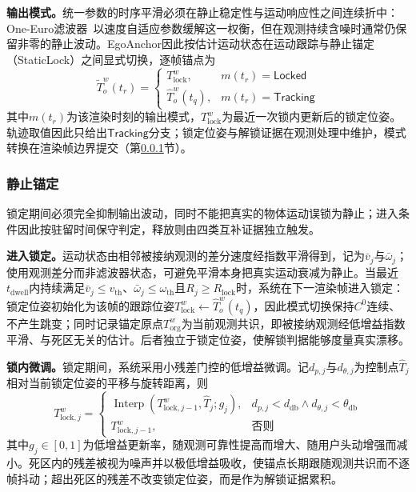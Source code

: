\documentclass[review]{vgtc}
\begin{document}
\textbf{输出模式。}统一参数的时序平滑必须在静止稳定性与运动响应性之间连续折中：One-Euro滤波器~\cite{casiez2012oneeuro}以速度自适应参数缓解这一权衡，但在观测持续含噪时通常仍保留非零的静止波动。EgoAnchor因此按估计运动状态在运动跟踪与静止锚定（StaticLock）之间显式切换，逐帧锚点为
\begin{equation}
\widetilde{T}_o^w(t_r) = \begin{cases}
T_{\mathrm{lock}}^w, & m(t_r) = \mathsf{Locked} \\
\widehat{T}_o^w(t_q), & m(t_r) = \mathsf{Tracking}
\end{cases}
\label{eq:staticlock}
\end{equation}
其中$m(t_r)$为该渲染时刻的输出模式，$T_{\mathrm{lock}}^w$为最近一次锁内更新后的锁定位姿。轨迹取值因此只给出$\mathsf{Tracking}$分支；锁定位姿与解锁证据在观测处理中维护，模式转换在渲染帧边界提交（第\ref{sec:staticlock}节）。

\subsubsection{静止锚定}\label{sec:staticlock}

锁定期间必须完全抑制输出波动，同时不能把真实的物体运动误锁为静止；进入条件因此按驻留时间保守判定，释放则由四类互补证据独立触发。

\textbf{进入锁定。}运动状态由相邻被接纳观测的差分速度经指数平滑得到，记为$\bar{v}_j$与$\bar{\omega}_j$；使用观测差分而非滤波器状态，可避免平滑本身把真实运动衰减为静止。当最近$t_{\mathrm{dwell}}$内持续满足$\bar{v}_j \leq v_{\mathrm{th}}$、$\bar{\omega}_j \leq \omega_{\mathrm{th}}$且$R_j \geq R_{\mathrm{lock}}$时，系统在下一渲染帧进入锁定：锁定位姿初始化为该帧的跟踪位姿$T_{\mathrm{lock}}^w \leftarrow \widehat{T}_o^w(t_q)$，因此模式切换保持$C^0$连续、不产生跳变；同时记录锚定原点$T_{\mathrm{org}}^w$为当前观测共识，即被接纳观测经低增益指数平滑、与死区无关的估计。后者独立于锁定位姿，使解锁判据能够度量真实漂移。

\textbf{锁内微调。}锁定期间，系统采用小残差门控的低增益微调。记$d_{p,j}$与$d_{\theta,j}$为控制点$\widehat{T}_j$相对当前锁定位姿的平移与旋转距离，则
\begin{equation}
T_{\mathrm{lock},j}^w = \begin{cases}
\operatorname{Interp}\!\left(T_{\mathrm{lock},j-1}^w, \widehat{T}_j; g_j\right), & d_{p,j} < d_{\mathrm{db}} \wedge d_{\theta,j} < \theta_{\mathrm{db}} \\
T_{\mathrm{lock},j-1}^w, & \text{否则}
\end{cases}
\label{eq:lock-creep}
\end{equation}
其中$g_j \in [0,1]$为低增益更新率，随观测可靠性提高而增大、随用户头动增强而减小。死区内的残差被视为噪声并以极低增益吸收，使锚点长期跟随观测共识而不逐帧抖动；超出死区的残差不改变锁定位姿，而是作为解锁证据累积。
\end{document}
